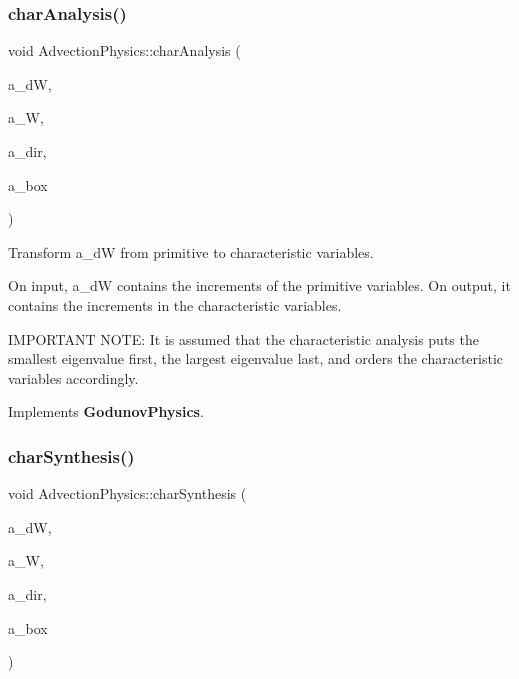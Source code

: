 \mbox{\label{class_advection_physics_a63895f9dd1173d14684c0681653c8d36}} 
\subsubsection{\texorpdfstring{char\+Analysis()}{charAnalysis()}}
{\footnotesize\ttfamily void Advection\+Physics\+::char\+Analysis (\begin{DoxyParamCaption}\item[{\textbf{ F\+Array\+Box} \&}]{a\+\_\+dW,  }\item[{const \textbf{ F\+Array\+Box} \&}]{a\+\_\+W,  }\item[{const int \&}]{a\+\_\+dir,  }\item[{const \textbf{ Box} \&}]{a\+\_\+box }\end{DoxyParamCaption})\hspace{0.3cm}{\ttfamily [virtual]}}



Transform a\+\_\+dW from primitive to characteristic variables. 

On input, a\+\_\+dW contains the increments of the primitive variables. On output, it contains the increments in the characteristic variables.

I\+M\+P\+O\+R\+T\+A\+NT N\+O\+TE\+: It is assumed that the characteristic analysis puts the smallest eigenvalue first, the largest eigenvalue last, and orders the characteristic variables accordingly. 

Implements \textbf{ Godunov\+Physics}.

\mbox{\label{class_advection_physics_a8b1269b718057fe2a5d0bc8bdd183d0b}} 
\subsubsection{\texorpdfstring{char\+Synthesis()}{charSynthesis()}}
{\footnotesize\ttfamily void Advection\+Physics\+::char\+Synthesis (\begin{DoxyParamCaption}\item[{\textbf{ F\+Array\+Box} \&}]{a\+\_\+dW,  }\item[{const \textbf{ F\+Array\+Box} \&}]{a\+\_\+W,  }\item[{const int \&}]{a\+\_\+dir,  }\item[{const \textbf{ Box} \&}]{a\+\_\+box }\end{DoxyParamCaption})\hspace{0.3cm}{\ttfamily [virtual]}}



